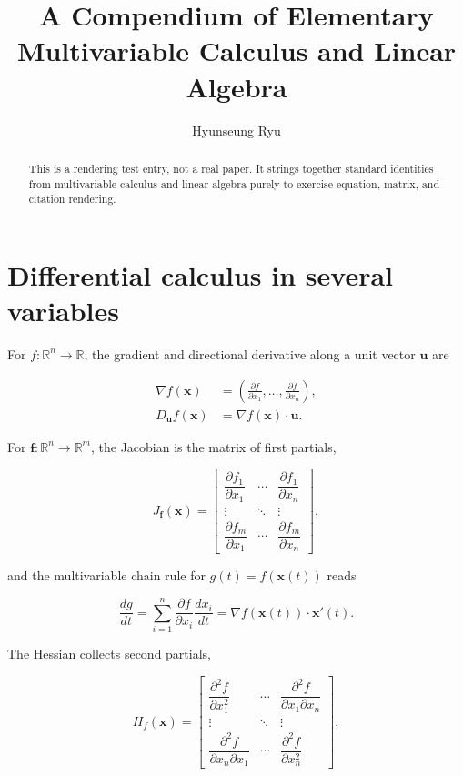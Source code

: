 \documentclass{article}
\title{A Compendium of Elementary Multivariable Calculus and Linear Algebra}
\author{Hyunseung Ryu}
\begin{document}
\maketitle

\begin{abstract}
This is a rendering test entry, not a real paper. It strings together standard
identities from multivariable calculus and linear algebra
\cite{apostol1969,strang2016} purely to exercise equation, matrix, and
citation rendering.
\end{abstract}

\section{Differential calculus in several variables}

For $f : \mathbb{R}^n \to \mathbb{R}$, the gradient and directional derivative
along a unit vector $\mathbf{u}$ are

\begin{align}
  \nabla f(\mathbf{x}) &= \left( \frac{\partial f}{\partial x_1}, \ldots,
    \frac{\partial f}{\partial x_n} \right), \\
  D_{\mathbf{u}} f(\mathbf{x}) &= \nabla f(\mathbf{x}) \cdot \mathbf{u}.
\end{align}

For $\mathbf{f} : \mathbb{R}^n \to \mathbb{R}^m$, the Jacobian is the matrix of
first partials,

\begin{equation}
  J_{\mathbf{f}}(\mathbf{x}) =
  \begin{bmatrix}
    \dfrac{\partial f_1}{\partial x_1} & \cdots & \dfrac{\partial f_1}{\partial x_n} \\
    \vdots & \ddots & \vdots \\
    \dfrac{\partial f_m}{\partial x_1} & \cdots & \dfrac{\partial f_m}{\partial x_n}
  \end{bmatrix},
\end{equation}

and the multivariable chain rule for $g(t) = f(\mathbf{x}(t))$ reads

\begin{equation}
  \frac{dg}{dt} = \sum_{i=1}^{n} \frac{\partial f}{\partial x_i} \frac{dx_i}{dt}
    = \nabla f(\mathbf{x}(t)) \cdot \mathbf{x}'(t).
\end{equation}

The Hessian collects second partials,

\begin{equation}
  H_f(\mathbf{x}) =
  \begin{bmatrix}
    \dfrac{\partial^2 f}{\partial x_1^2} & \cdots & \dfrac{\partial^2 f}{\partial x_1 \partial x_n} \\
    \vdots & \ddots & \vdots \\
    \dfrac{\partial^2 f}{\partial x_n \partial x_1} & \cdots & \dfrac{\partial^2 f}{\partial x_n^2}
  \end{bmatrix},
\end{equation}
\end{document}
